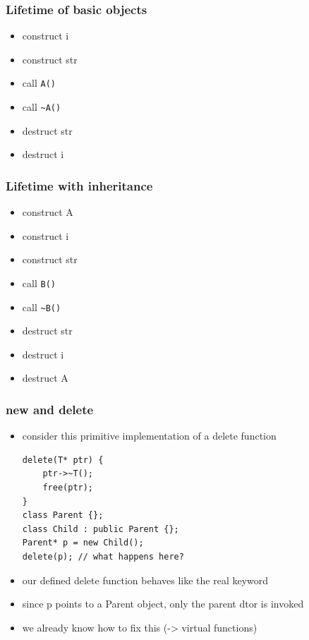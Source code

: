 \begin{frame}[fragile]
    \frametitle{Lifetime of basic objects}
    \begin{itemize}
    \begin{lstlisting}[numbers=none]
struct A {
    int i;
    string str;
};
    \end{lstlisting}
    \item construct i
    \item construct str
    \item call \lstinline{A()}
    \item call \lstinline{~A()}
    \item destruct str
    \item destruct i
    \end{itemize}
\end{frame}

\begin{frame}[fragile]
    \frametitle{Lifetime with inheritance}
    \begin{itemize}
    \begin{lstlisting}[numbers=none]
struct A { /* ... */ };
struct B : public A {
    int i;
    string str;
};
    \end{lstlisting}
    \item construct A
    \item construct i
    \item construct str
    \item call \lstinline{B()}
    \item call \lstinline{~B()}
    \item destruct str
    \item destruct i
    \item destruct A
    \end{itemize}
\end{frame}

\begin{frame}[fragile]
    \frametitle{new and delete}
    \begin{itemize}
    \item consider this primitive implementation of a delete function
    \begin{lstlisting}[numbers=none]
delete(T* ptr) {
    ptr->~T();
    free(ptr);
}
class Parent {};
class Child : public Parent {};
Parent* p = new Child();
delete(p); // what happens here?
    \end{lstlisting}
    \item our defined delete function behaves like the real keyword
    \item since p points to a Parent object, only the parent dtor is invoked
    \item we already know how to fix this (-> virtual functions)
    \end{itemize}
\end{frame}

